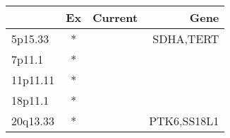 \begin{tabular}{lccr}
\toprule
{} & Ex & Current &         Gene \\
\midrule
5p15.33  &  * &         &    SDHA,TERT \\
7p11.1   &  * &         &              \\
11p11.11 &  * &         &              \\
18p11.1  &  * &         &              \\
20q13.33 &  * &         &  PTK6,SS18L1 \\
\bottomrule
\end{tabular}
